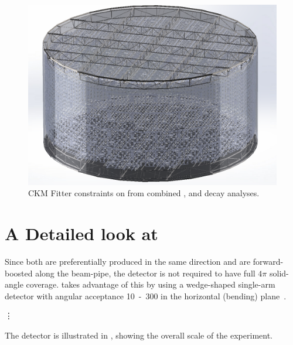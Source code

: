 \begin{figure}
    \includegraphics[width=\largefigwidth]{diagrams/chips_render_2}
    \caption[CKM Fitter constraints on \alphaCKM.]%
    {CKM Fitter constraints on \alphaCKM from combined \BToPiPi,
        \BToRhoPi and \BToRhoRho decay analyses.}
    \label{fig:chips_render_2}
\end{figure}


\section{A Detailed look at \chips}
\label{sec:detailedchips}

Since both  are preferentially produced in the same direction
and are forward-boosted along the beam-pipe, the detector is not required
to have full $4\pi$ solid-angle coverage. \LHCb takes advantage of this
by using a wedge-shaped single-arm detector with angular acceptance
\unit{10-300}{\mrad} in the horizontal (bending) plane~\cite{Amato:1998xt}.

\vspace{1cm}

\begin{center}
    {\hspace{1mm}\Large\vdots\hspace{1cm}}
\end{center}

\vspace{1cm}

The detector is illustrated in , showing
the overall scale of the experiment.

